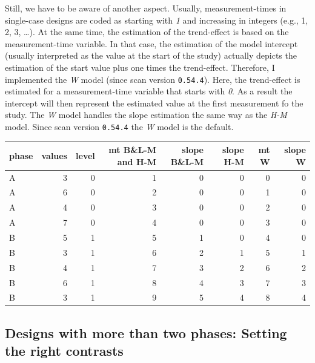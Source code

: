 \documentclass[
  letterpaper,
  DIV=11,
  numbers=noendperiod]{scrreprt}
\begin{document}
Still, we have to be aware of another aspect. Usually, measurement-times
in single-case designs are coded as starting with \emph{1} and
increasing in integers (e.g., 1, 2, 3, \ldots). At the same time, the
estimation of the trend-effect is based on the measurement-time
variable. In that case, the estimation of the model intercept (usually
interpreted as the value at the start of the study) actually depicts the
estimation of the start value plus one times the trend-effect.
Therefore, I implemented the \emph{W} model (since scan version
\texttt{0.54.4}). Here, the trend-effect is estimated for a
measurement-time variable that starts with \emph{0}. As a result the
intercept will then represent the estimated value at the first
measurement fo the study. The \emph{W} model handles the slope
estimation the same way as the \emph{H-M} model. Since scan version
\texttt{0.54.4} the \emph{W} model is the default.

\hfill\break

\begin{longtable}[]{@{}lrrrrrrr@{}}
\toprule()
phase & values & level & mt B\&L-M and H-M & slope B\&L-M & slope H-M &
mt W & slope W \\
\midrule()
\endhead
A & 3 & 0 & 1 & 0 & 0 & 0 & 0 \\
A & 6 & 0 & 2 & 0 & 0 & 1 & 0 \\
A & 4 & 0 & 3 & 0 & 0 & 2 & 0 \\
A & 7 & 0 & 4 & 0 & 0 & 3 & 0 \\
B & 5 & 1 & 5 & 1 & 0 & 4 & 0 \\
B & 3 & 1 & 6 & 2 & 1 & 5 & 1 \\
B & 4 & 1 & 7 & 3 & 2 & 6 & 2 \\
B & 6 & 1 & 8 & 4 & 3 & 7 & 3 \\
B & 3 & 1 & 9 & 5 & 4 & 8 & 4 \\
\bottomrule()
\end{longtable}

\hypertarget{designs-with-more-than-two-phases-setting-the-right-contrasts}{%
\subsection{Designs with more than two phases: Setting the right
contrasts}\label{designs-with-more-than-two-phases-setting-the-right-contrasts}}
\end{document}
